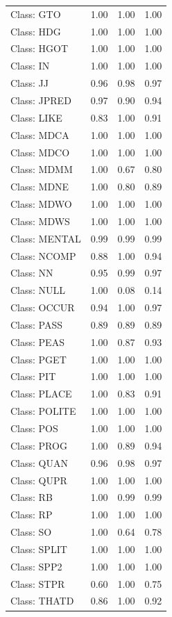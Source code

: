 \documentclass[
  letterpaper,
  DIV=11,
  numbers=noendperiod]{scrreprt}
\begin{document}
\begin{longtable}[]{@{}lrrr@{}}
Class: GTO & 1.00 & 1.00 & 1.00 \\
Class: HDG & 1.00 & 1.00 & 1.00 \\
Class: HGOT & 1.00 & 1.00 & 1.00 \\
Class: IN & 1.00 & 1.00 & 1.00 \\
Class: JJ & 0.96 & 0.98 & 0.97 \\
Class: JPRED & 0.97 & 0.90 & 0.94 \\
Class: LIKE & 0.83 & 1.00 & 0.91 \\
Class: MDCA & 1.00 & 1.00 & 1.00 \\
Class: MDCO & 1.00 & 1.00 & 1.00 \\
Class: MDMM & 1.00 & 0.67 & 0.80 \\
Class: MDNE & 1.00 & 0.80 & 0.89 \\
Class: MDWO & 1.00 & 1.00 & 1.00 \\
Class: MDWS & 1.00 & 1.00 & 1.00 \\
Class: MENTAL & 0.99 & 0.99 & 0.99 \\
Class: NCOMP & 0.88 & 1.00 & 0.94 \\
Class: NN & 0.95 & 0.99 & 0.97 \\
Class: NULL & 1.00 & 0.08 & 0.14 \\
Class: OCCUR & 0.94 & 1.00 & 0.97 \\
Class: PASS & 0.89 & 0.89 & 0.89 \\
Class: PEAS & 1.00 & 0.87 & 0.93 \\
Class: PGET & 1.00 & 1.00 & 1.00 \\
Class: PIT & 1.00 & 1.00 & 1.00 \\
Class: PLACE & 1.00 & 0.83 & 0.91 \\
Class: POLITE & 1.00 & 1.00 & 1.00 \\
Class: POS & 1.00 & 1.00 & 1.00 \\
Class: PROG & 1.00 & 0.89 & 0.94 \\
Class: QUAN & 0.96 & 0.98 & 0.97 \\
Class: QUPR & 1.00 & 1.00 & 1.00 \\
Class: RB & 1.00 & 0.99 & 0.99 \\
Class: RP & 1.00 & 1.00 & 1.00 \\
Class: SO & 1.00 & 0.64 & 0.78 \\
Class: SPLIT & 1.00 & 1.00 & 1.00 \\
Class: SPP2 & 1.00 & 1.00 & 1.00 \\
Class: STPR & 0.60 & 1.00 & 0.75 \\
Class: THATD & 0.86 & 1.00 & 0.92 \\

\end{longtable}
\end{document}

